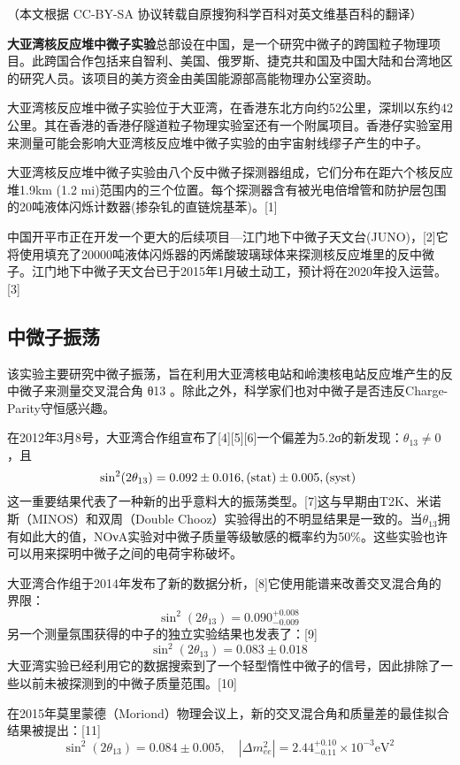 
（本文根据 CC-BY-SA 协议转载自原搜狗科学百科对英文维基百科的翻译）

\textbf{大亚湾核反应堆中微子实验}总部设在中国，是一个研究中微子的跨国粒子物理项目。此跨国合作包括来自智利、美国、俄罗斯、捷克共和国及中国大陆和台湾地区的研究人员。该项目的美方资金由美国能源部高能物理办公室资助。

大亚湾核反应堆中微子实验位于大亚湾，在香港东北方向约52公里，深圳以东约42公里。其在香港的香港仔隧道粒子物理实验室还有一个附属项目。香港仔实验室用来测量可能会影响大亚湾核反应堆中微子实验的由宇宙射线缪子产生的中子。

大亚湾核反应堆中微子实验由八个反中微子探测器组成，它们分布在距六个核反应堆1.9km (1.2 mi)范围内的三个位置。每个探测器含有被光电倍增管和防护层包围的20吨液体闪烁计数器(掺杂钆的直链烷基苯)。[1]

中国开平市正在开发一个更大的后续项目—江门地下中微子天文台(JUNO)，[2]它将使用填充了20000吨液体闪烁器的丙烯酸玻璃球体来探测核反应堆里的反中微子。江门地下中微子天文台已于2015年1月破土动工，预计将在2020年投入运营。[3]

\subsection{中微子振荡}
该实验主要研究中微子振荡，旨在利用大亚湾核电站和岭澳核电站反应堆产生的反中微子来测量交叉混合角 θ13 。除此之外，科学家们也对中微子是否违反Charge-Parity守恒感兴趣。

在2012年3月8号，大亚湾合作组宣布了[4][5][6]一个偏差为5.2σ的新发现：$\theta_{13} \neq 0$，且
$$\sin^2(2 \theta_{13}) = 0.092 \pm 0.016 \\, (\text{stat}) \pm 0.005 \\, (\text{syst})~$$
这一重要结果代表了一种新的出乎意料大的振荡类型。[7]这与早期由T2K、米诺斯（MINOS）和双周（Double Chooz）实验得出的不明显结果是一致的。当$\theta_{13}$拥有如此大的值，NOνA实验对中微子质量等级敏感的概率约为50\%。这些实验也许可以用来探明中微子之间的电荷宇称破坏。

大亚湾合作组于2014年发布了新的数据分析，[8]它使用能谱来改善交叉混合角的界限：
$$\sin^2(2 \theta_{13}) = 0.090^{+0.008}_{-0.009}~$$
另一个测量氛围获得的中子的独立实验结果也发表了：[9]
$$\sin^2(2 \theta_{13}) = 0.083 \pm 0.018~$$
大亚湾实验已经利用它的数据搜索到了一个轻型惰性中微子的信号，因此排除了一些以前未被探测到的中微子质量范围。[10]

在2015年莫里蒙德（Moriond）物理会议上，新的交叉混合角和质量差的最佳拟合结果被提出：[11]
$$\sin^2(2 \theta_{13}) = 0.084 \pm 0.005, \quad \left| \Delta m^2_{ee} \right| = 2.44^{+0.10}_{-0.11} \times 10^{-3} \text{eV}^2~$$

